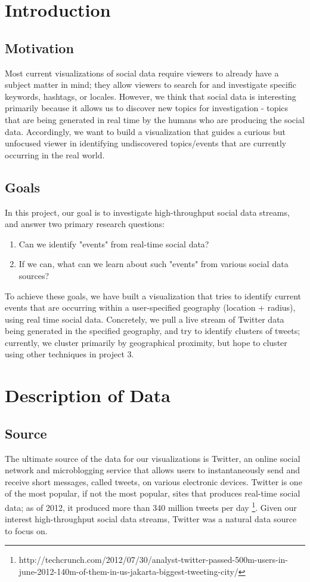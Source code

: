 \documentclass[pdftex,12pt,a4paper]{article}
\begin{document}

\tableofcontents
\pagebreak

\section{Introduction}
\subsection{Motivation}
Most current visualizations of social data require viewers to already have a subject matter in mind; they allow viewers to search for and investigate specific keywords, hashtags, or locales. However, we think that social data is interesting primarily because it allows us to discover new topics for investigation - topics that are being generated in real time by the humans who are producing the social data. Accordingly, we want to build a visualization that guides a curious but unfocused viewer in identifying undiscovered topics/events that are currently occurring in the real world.
\subsection{Goals}
In this project, our goal is to investigate high-throughput social data streams, and answer two primary research questions:
\begin{enumerate}
\item Can we identify "events" from real-time social data?
\item If we can, what can we learn about such "events" from various social data sources?
\end{enumerate}
To achieve these goals, we have built a visualization that tries to identify current events that are occurring within a user-specified geography (location + radius), using real time social data. Concretely, we pull a live stream of Twitter data being generated in the specified geography, and try to identify clusters of tweets; currently, we cluster primarily by geographical proximity, but hope to cluster using other techniques in project 3.

\section{Description of Data}
\subsection{Source}
The ultimate source of the data for our visualizations is Twitter, an online social network and microblogging service that allows users to instantaneously send and receive short messages, called tweets, on various electronic devices. Twitter is one of the most popular, if not the most popular, sites that produces real-time social data; as of 2012, it produced more than 340 million tweets per day \footnote{http://techcrunch.com/2012/07/30/analyst-twitter-passed-500m-users-in-june-2012-140m-of-them-in-us-jakarta-biggest-tweeting-city/}. Given our interest high-throughput social data streams, Twitter was a natural data source to focus on.
\end{document}

